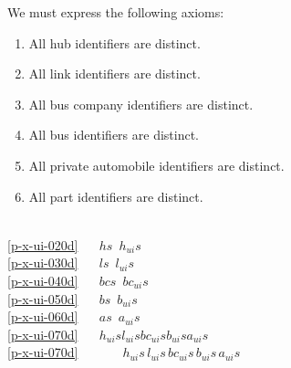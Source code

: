 \LLLL
\begynd
\pind We must express the following axioms:
\afslut
\begin{enumerate}\setei
\item \label{p-x-ui-020d} All hub identifiers are distinct.
\item \label{p-x-ui-030d} All link identifiers are distinct.
\item \label{p-x-ui-040d} All bus company identifiers are distinct.
\item \label{p-x-ui-050d} All bus identifiers are distinct.
\item \label{p-x-ui-060d} All private automobile identifiers are distinct.
\item \label{p-x-ui-070d} All part identifiers are distinct.
\savei\end{enumerate}\HHHH
\bp
{}\\
\ref{p-x-ui-020d}\ \ \ \,$hs$ {\EQ} \,$h_{ui}s$\\
\ref{p-x-ui-030d}\ \ \ \,$ls$ {\EQ} \,$l_{ui}s$\ \ \\
\ref{p-x-ui-040d}\ \ \ \,$bcs$ {\EQ} \,$bc_{ui}s$ \\
\ref{p-x-ui-050d}\ \ \ \,$bs$ {\EQ} \,$b_{ui}s$\\
\ref{p-x-ui-060d}\ \ \ \,$as$ {\EQ} \,$a_{ui}s$\\
\ref{p-x-ui-070d}\ \ \ \,{\LBRACE}$h_{ui}s${\UNION}$l_{ui}s${\UNION}$bc_{ui}s${\UNION}$b_{ui}s${\UNION}$a_{ui}s${\RBRACE} \\
\ref{p-x-ui-070d}\ \ \ \ \ \ {\EQ} \,$h_{ui}s${\PLUS}\,$l_{ui}s${\PLUS}\,$bc_{ui}s${\PLUS}\,$b_{ui}s${\PLUS}\,$a_{ui}s$  \eox
\ep


